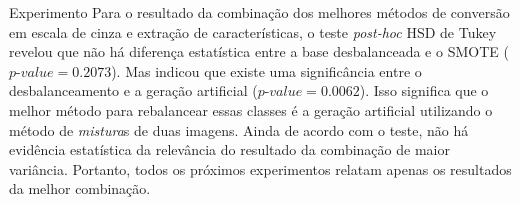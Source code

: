 \documentclass{beamer}
\begin{document}
\begin{frame}{Experimento}
  Para o resultado da combinação dos melhores métodos de conversão em escala de cinza e extração de características, o teste \textit{post-hoc} HSD de Tukey revelou que não há diferença estatística entre a base desbalanceada e o SMOTE ($\textit{p-value} = 0.2073$). Mas indicou que existe uma significância entre o desbalanceamento e a geração artificial ($\textit{p-value} = 0.0062$). Isso significa que o melhor método para rebalancear essas classes é a geração artificial utilizando o método de \emph{mistura}s de duas imagens. Ainda de acordo com o teste, não há evidência estatística da relevância do resultado da combinação de maior variância. Portanto, todos os próximos experimentos relatam apenas os resultados da melhor combinação.
\end{frame}
\end{document}
